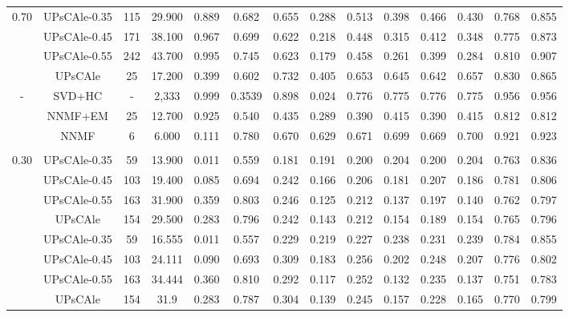 \begin{table*}
\begin{scriptsize}
\begin{tabular}{|c||c|c|c|c||c|c|c|c|c|c|c|c|c|}
\\ \hline	


\multirow{4}{*}{0.70} 
 & UPsCAle-0.35 & 115& 29.900 & 0.889 & 0.682 & 0.655 & 0.288 & 0.513 & 0.398 & 0.466 & 0.430 & 0.768 & 0.855
\\ 
 & UPsCAle-0.45 & 171& 38.100 & 0.967 & 0.699 & 0.622 & 0.218 & 0.448 & 0.315 & 0.412 & 0.348 & 0.775 & 0.873
\\ 
 & UPsCAle-0.55 & 242& 43.700 & 0.995 & 0.745 & 0.623 & 0.179 & 0.458 & 0.261 & 0.399 & 0.284 & 0.810 & 0.907 
\\
& UPsCAle  & 25 & 17.200 & 0.399 & 0.602 & 0.732 & 0.405 & 0.653 & 0.645 & 0.642 & 0.657 & 0.830 & 0.865
\\ \hline 


\multirow{4}{*}{-} 
 & SVD+HC & - &2,333 & 0.999 & 0.3539 & 0.898 & 0.024 & 0.776 & 0.775 & 0.776 & 0.775 & 0.956 & 0.956
\\
 & NNMF+EM & 25 & 12.700 & 0.925 & 0.540 & 0.435 & 0.289 & 0.390 & 0.415 & 0.390 & 0.415 & 0.812 & 0.812
\\ 
 & NNMF & 6 & 6.000 & 0.111 & 0.780 & 0.670 & 0.629 & 0.671 & 0.699 & 0.669 & 0.700 & 0.921 & 0.923  
\\ \hline	


\hline

\multicolumn{14}{|c|}{\textbf{AgNews}} 
\\ \hline \hline
 
 \multirow{3}{*}{0.30} 
  & UPsCAle-0.35 & 59&  13.900 & 0.011 & 0.559 & 0.181 & 0.191 & 0.200 & 0.204 & 0.200 & 0.204 & 0.763 & 0.836
\\ 
 & UPsCAle-0.45 & 103& 19.400 & 0.085 & 0.694 & 0.242 & 0.166 & 0.206 & 0.181 & 0.207 & 0.186 & 0.781 & 0.806
\\ 
 & UPsCAle-0.55 & 163& 31.900 & 0.359 & 0.803 & 0.246 & 0.125 & 0.212 & 0.137 & 0.197 & 0.140 & 0.762 & 0.797
\\
& UPsCAle        & 154 & 29.500 & 0.283 & 0.796 & 0.242 & 0.143 & 0.212 & 0.154 & 0.189 & 0.154 & 0.765 & 0.796 
\\ \hline{}


\multirow{3}{*}{0.50} 
 & UPsCAle-0.35 & 59& 16.555   & 0.011 &  0.557 &                  0.229 & 0.219  & 0.227 & 0.238  & 0.231 & 0.239  & 0.784 & 0.855
\\
 & UPsCAle-0.45 & 103 &  24.111  & 0.090 & 0.693 &              0.309 & 0.183  & 0.256 & 0.202  & 0.248 & 0.207  & 0.776 & 0.802
\\ 
 & UPsCAle-0.55 & 163&   34.444   & 0.360 & 0.810 &           0.292 & 0.117  & 0.252 & 0.132  & 0.235 & 0.137  & 0.751 & 0.783 
 \\
 & UPsCAle & 154 &   31.9   & 0.283 & 0.787 & 0.304 & 0.139  & 0.245 & 0.157 & 0.228 & 0.165  & 0.770 & 0.799 
\\ \hline


\end{tabular}
\end{scriptsize}
\end{table*}
